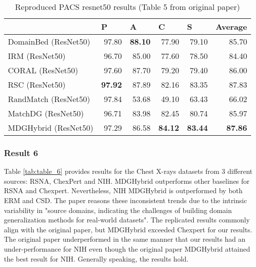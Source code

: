 \begin{table}[]
\centering
\caption{\label{tab:table_5}Reproduced PACS resnet50 results (Table 5 from original paper)}
\begin{tabular}{l|r|r|r|r|r}
\hline
                     & \multicolumn{1}{l|}{P} & \multicolumn{1}{l|}{A}        & \multicolumn{1}{l|}{C} & \multicolumn{1}{l|}{S} & \multicolumn{1}{l}{Average} \\ \hline
DomainBed (ResNet50) & 97.80                  & \textbf{88.10}                & 77.90                  & 79.10                  & 85.70                       \\
IRM (ResNet50)       & 96.70                  & 85.00                         & 77.60                  & 78.50                  & 84.40                       \\
CORAL (ResNet50)     & 97.60                  & 87.70                         & 79.20                  & 79.40                  & 86.00                       \\
RSC (ResNet50)       & \textbf{97.92}         & 87.89                         & 82.16                  & 83.35                  & 87.83                       \\
RandMatch (ResNet50) & 97.84                  & 53.68                         & 49.10                  & 63.43                  & 66.02                       \\
MatchDG (ResNet50)   & 96.71                  & 83.98                         & 82.45                  & 80.74                  & 85.97                       \\
MDGHybrid (ResNet50) & 97.29                  & 86.58 & \textbf{84.12}         & \textbf{83.44}         & \textbf{87.86}              \\ \hline
\end{tabular}
\end{table}


\subsubsection{Result 6}

Table \ref{tab:table_6} provides results for the Chest X-rays datasets from 3 different sources: RSNA, ChexPert and NIH. MDGHybrid outperforms other baselines for RSNA and Chexpert. Nevertheless, NIH MDGHybrid is outperformed by both ERM and CSD. The paper reasons these inconsistent trends due to the intrinsic variability in "source domains, indicating the challenges of building domain generalization methods for real-world datasets". The replicated results commonly align with the original paper, but MDGHybrid exceeded Chexpert for our results. The original paper underperformed in the same manner that our results had an under-performance for NIH even though the original paper MDGHybrid attained the best result for NIH. Generally speaking, the results hold.


